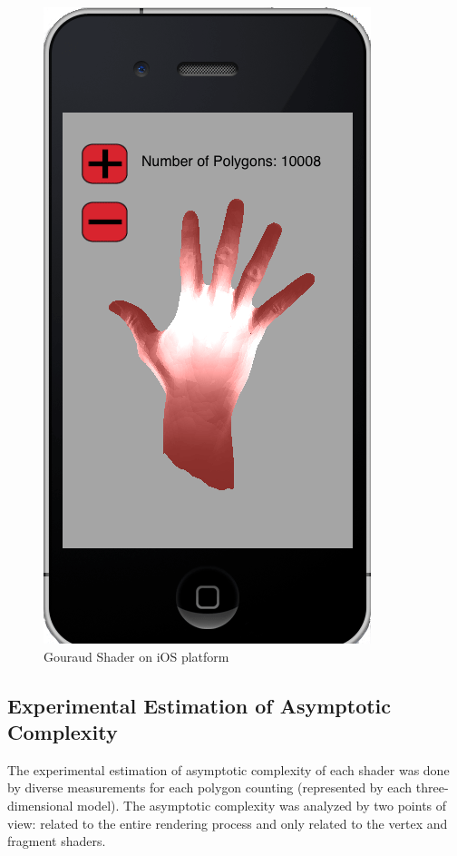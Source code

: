 \documentclass[10pt, conference, compsocconf]{IEEEtran}
\begin{document}
	\begin{figure}[!t]
	\centering
		\includegraphics[keepaspectratio=true,scale=0.25]{gouraud_ios.png}
	\caption{Gouraud Shader on iOS platform }
	\label{gouraud_ios}
	\end{figure}
	
\subsection{Experimental Estimation of Asymptotic Complexity}
\label{sec:assy}

The experimental estimation of asymptotic complexity of each shader
was done by diverse measurements for each polygon counting (represented by each three-dimensional model). The
asymptotic complexity was analyzed by two points of view: related to the
entire rendering process and only related to the vertex and fragment shaders.
\end{document}
